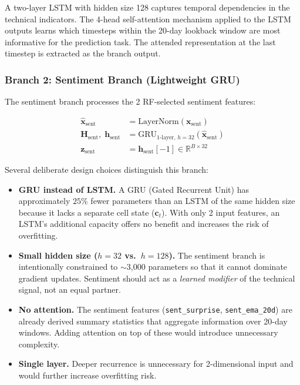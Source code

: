 A two-layer LSTM with hidden size 128 captures temporal dependencies in the
technical indicators.  The 4-head self-attention mechanism applied to the LSTM
outputs learns which timesteps within the 20-day lookback window are most
informative for the prediction task.  The attended representation at the last
timestep is extracted as the branch output.

\subsubsection{Branch 2: Sentiment Branch (Lightweight GRU)}

The sentiment branch processes the 2 RF-selected sentiment features:

\begin{align}
  \hat{\mathbf{x}}_{\text{sent}} &= \text{LayerNorm}(\mathbf{x}_{\text{sent}}) \\
  \mathbf{H}_{\text{sent}},\; \mathbf{h}_{\text{sent}} &=
    \text{GRU}_{1\text{-layer, }h{=}32}(\hat{\mathbf{x}}_{\text{sent}}) \\
  \mathbf{z}_{\text{sent}} &= \mathbf{h}_{\text{sent}}[-1]
    \in \mathbb{R}^{B \times 32}
\end{align}

Several deliberate design choices distinguish this branch:

\begin{itemize}
  \item \textbf{GRU instead of LSTM.}  A GRU (Gated Recurrent Unit) has
        approximately $25\%$ fewer parameters than an LSTM of the same hidden
        size because it lacks a separate cell state ($\mathbf{c}_t$).  With only
        2 input features, an LSTM's additional capacity offers no benefit and
        increases the risk of overfitting.

  \item \textbf{Small hidden size ($h = 32$ vs.\ $h = 128$).}  The sentiment
        branch is intentionally constrained to ${\sim}$3{,}000 parameters so
        that it cannot dominate gradient updates.  Sentiment should act as a
        \emph{learned modifier} of the technical signal, not an equal partner.

  \item \textbf{No attention.}  The sentiment features (\texttt{sent\_surprise},
        \texttt{sent\_ema\_20d}) are already derived summary statistics that
        aggregate information over 20-day windows.  Adding attention on top of
        these would introduce unnecessary complexity.

  \item \textbf{Single layer.}  Deeper recurrence is unnecessary for 2-dimensional
        input and would further increase overfitting risk.
\end{itemize}

